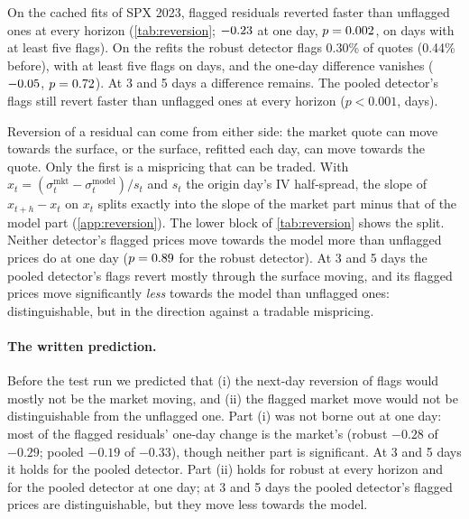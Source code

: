 On the cached fits of SPX 2023, flagged residuals reverted faster than unflagged ones at every horizon
(\cref{tab:reversion}; $-0.23$ at one day, $p=0.002$, on \revCachedDays{} days with at
least five flags). On the refits the robust detector flags 0.30\% of quotes (0.44\% before), with at
least five flags on \revDays{} days, and the one-day difference vanishes ($-0.05$,
$p=0.72$). At 3 and 5 days a difference remains. The pooled detector's flags still revert faster
than unflagged ones at every horizon ($p<0.001$, \revSegDays{} days).

Reversion of a residual can come from either side: the market quote can move towards the surface,
or the surface, refitted each day, can move towards the quote. Only the first is a mispricing that
can be traded. With $x_t=(\sigma^{\text{mkt}}_t-\sigma^{\text{model}}_t)/s_t$ and $s_t$ the origin
day's IV half-spread, the slope of $x_{t+h}-x_t$ on $x_t$ splits exactly into the slope of the market
part minus that of the model part (\cref{app:reversion}). The lower block of \cref{tab:reversion}
shows the split. Neither detector's flagged prices move towards the model more than unflagged prices
do at one day ($p=0.89$ for the robust detector). At 3 and 5 days the pooled detector's
flags revert mostly through the surface moving, and its flagged prices move significantly
\emph{less} towards the model than unflagged ones: distinguishable, but in the direction against a
tradable mispricing.

\begin{table}[t]
  \centering\small
  \caption{Reversion on SPX 2023 at margin 4. Upper block: flagged minus unflagged reversion slope of
  price residuals ($p$-values in parentheses; negative means flags revert faster). Lower block: slopes
  of IV residuals in origin-day half-spreads, split into the market's move and the model's; a
  positive model part is the surface moving towards the quote. The last rows test whether flagged
  prices move towards the model more than unflagged ones.}
  \label{tab:reversion}
  
\end{table}

\paragraph{The written prediction.} Before the test run we predicted that (i) the next-day reversion
of flags would mostly not be the market moving, and (ii) the flagged market move would not be
distinguishable from the unflagged one. Part (i) was not borne out at one day: most of the flagged
residuals' one-day change is the market's (robust $-0.28$ of $-0.29$; pooled $-0.19$ of $-0.33$),
though neither part is significant. At 3 and 5 days it holds for the pooled detector. Part (ii) holds
for robust \mixfour{} at every horizon and for the pooled detector at one day; at 3 and 5 days the
pooled detector's flagged prices are distinguishable, but they move less towards the model.

